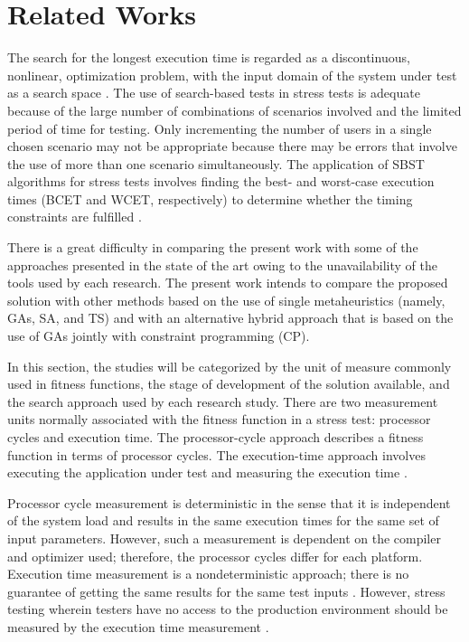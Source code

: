 \documentclass{bmcart}
\begin{document}
\section{Related Works}

The search for the longest execution time is regarded as a discontinuous, nonlinear, optimization problem, with the input domain of the system under test as a search space \citep{Sullivan}.  The use of search-based tests in stress tests is adequate because of the large number of combinations of scenarios involved and the limited period of time for testing. Only incrementing the number of users in a single chosen scenario may not be appropriate because there may be errors that involve the use of more than one scenario simultaneously. The application of SBST algorithms for stress tests involves finding the best- and worst-case execution times (BCET and WCET, respectively) to determine whether the timing constraints are fulfilled \citep{Afzal2009a}. 

There is a great difficulty in comparing the present work with some of the approaches presented in the state of the art owing to the unavailability of the tools used by each research.  The present work intends to compare the proposed solution with other methods based on the use of single metaheuristics (namely, GAs, SA, and TS) and with an alternative hybrid approach that is based on the use of GAs jointly with constraint programming (CP).

In this section, the studies will be categorized by the unit of measure commonly used in fitness functions, the stage of development of the solution available, and the search approach used  by each research study. There are two measurement units normally associated with the fitness function in a stress test: processor cycles and execution time. The processor-cycle approach describes a fitness function in terms of processor cycles. The execution-time approach involves executing the application under test and measuring the execution time \citep{Afzal2009a} \citep{tracey2000search}.

Processor cycle measurement is deterministic in the sense that it is independent of the system load and results in the same execution times for the same set of input parameters. However, such a measurement is dependent on the compiler and optimizer used; therefore, the processor cycles differ for each platform. Execution time measurement is a nondeterministic approach; there is no guarantee of getting the same results for the same test inputs \citep{Afzal2009a}.  However, stress testing wherein testers have no access to the production environment should be measured by the execution time measurement \citep{Molyneaux2009} \citep{Afzal2009a}.
\end{document}
